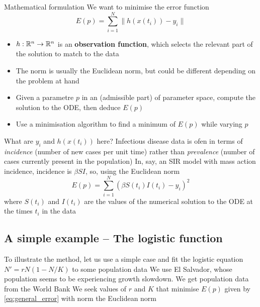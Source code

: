 \documentclass[aspectratio=169]{beamer}
\begin{document}
\begin{frame}{Mathematical formulation}
We want to minimise the error function
\begin{equation}\label{eq:general_error}
    E(p) = \sum_{i=1}^N \|h(x(t_i))-y_i\|
\end{equation}
\begin{itemize}
    \item $h:\mathbb{R}^n\to\mathbb{R}^n$ is an \textbf{observation function}, which selects the relevant part of the solution to match to the data
    \item The norm is usually the Euclidean norm, but could be different depending on the problem at hand
    \item Given a parametre $p$ in an (admissible part) of parameter space, compute the solution to the ODE, then deduce $E(p)$
    \item Use a minimisation algorithm to find a minimum of $E(p)$ while varying $p$  
\end{itemize}
\end{frame}



\begin{frame}{What are $y_i$ and $h(x(t_i))$ here?}
    Infectious disease data is ofen in terms of \emph{incidence} (number of new cases per unit time) rather than \emph{prevalence} (number of cases currently present in the population)
    \vfill
    In, say, an SIR model with mass action incidence, incidence is $\beta SI$, so, using the Euclidean norm
    \begin{equation}
        E(p)=\sum_{i=1}^N(\beta S(t_i)I(t_i)-y_i)^2
    \end{equation}
    where $S(t_i)$ and $I(t_i)$ are the values of the numerical solution to the ODE at the times $t_i$ in the data 
\end{frame}


\subsection{A simple example -- The logistic function}

\begin{frame}{}
    To illustrate the method, let us use  a simple case and fit the logistic equation $N'=rN(1-N/K)$ to some population data
    \vfill 
    We use El Salvador, whose population seems to be experiencing growth slowdown. We get population data from the World Bank
    \vfill
    We seek values of $r$ and $K$ that minimise $E(p)$ given by \eqref{eq:general_error} with norm the Euclidean norm
\end{frame}
\end{document}
